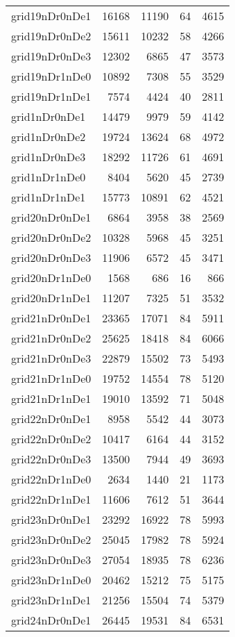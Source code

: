 \begin{tabular}{lrrrr}
grid19nDr0nDe1 & 16168 & 11190 & 64 & 4615 \\
grid19nDr0nDe2 & 15611 & 10232 & 58 & 4266 \\
grid19nDr0nDe3 & 12302 & 6865 & 47 & 3573 \\
grid19nDr1nDe0 & 10892 & 7308 & 55 & 3529 \\
grid19nDr1nDe1 & 7574 & 4424 & 40 & 2811 \\
grid1nDr0nDe1 & 14479 & 9979 & 59 & 4142 \\
grid1nDr0nDe2 & 19724 & 13624 & 68 & 4972 \\
grid1nDr0nDe3 & 18292 & 11726 & 61 & 4691 \\
grid1nDr1nDe0 & 8404 & 5620 & 45 & 2739 \\
grid1nDr1nDe1 & 15773 & 10891 & 62 & 4521 \\
grid20nDr0nDe1 & 6864 & 3958 & 38 & 2569 \\
grid20nDr0nDe2 & 10328 & 5968 & 45 & 3251 \\
grid20nDr0nDe3 & 11906 & 6572 & 45 & 3471 \\
grid20nDr1nDe0 & 1568 & 686 & 16 & 866 \\
grid20nDr1nDe1 & 11207 & 7325 & 51 & 3532 \\
grid21nDr0nDe1 & 23365 & 17071 & 84 & 5911 \\
grid21nDr0nDe2 & 25625 & 18418 & 84 & 6066 \\
grid21nDr0nDe3 & 22879 & 15502 & 73 & 5493 \\
grid21nDr1nDe0 & 19752 & 14554 & 78 & 5120 \\
grid21nDr1nDe1 & 19010 & 13592 & 71 & 5048 \\
grid22nDr0nDe1 & 8958 & 5542 & 44 & 3073 \\
grid22nDr0nDe2 & 10417 & 6164 & 44 & 3152 \\
grid22nDr0nDe3 & 13500 & 7944 & 49 & 3693 \\
grid22nDr1nDe0 & 2634 & 1440 & 21 & 1173 \\
grid22nDr1nDe1 & 11606 & 7612 & 51 & 3644 \\
grid23nDr0nDe1 & 23292 & 16922 & 78 & 5993 \\
grid23nDr0nDe2 & 25045 & 17982 & 78 & 5924 \\
grid23nDr0nDe3 & 27054 & 18935 & 78 & 6236 \\
grid23nDr1nDe0 & 20462 & 15212 & 75 & 5175 \\
grid23nDr1nDe1 & 21256 & 15504 & 74 & 5379 \\
grid24nDr0nDe1 & 26445 & 19531 & 84 & 6531 \\

\end{tabular}
